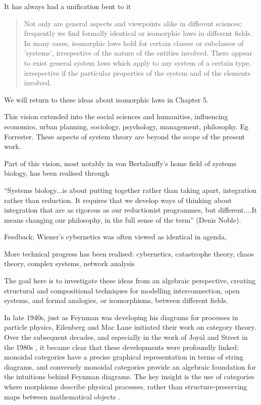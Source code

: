 It has always had a unification bent to it \cite{Ber50}

\begin{quotation}
  Not only are general aspects and viewpoints alike in different sciences;
  frequently we find formally identical or isomorphic laws in different fields.
  In many cases, isomorphic laws hold for certain classes or subclasses of
  'systems', irrespective of the nature of the entities involved. There appear
  to exist general system laws which apply to any system of a certain type,
  irrespective if the particular properties of the system and of the elements
  involved.
\end{quotation}
We will return to these ideas about isomorphic laws in Chapter 5.

This vision extended into the social sciences and humanities, influencing
economics, urban planning, sociology, psychology, management, philosophy. Eg
Forrester. These aspects of system theory are beyond the scope of the present
work.

Part of this vision, most notably in von Bertalanffy's home field of
systems biology, has been realised through 


    ``Systems biology...is about putting together rather than taking apart,
    integration rather than reduction. It requires that we develop ways of
    thinking about integration that are as rigorous as our reductionist
    programmes, but different....It means changing our philosophy, in the full
    sense of the term'' (Denis Noble).

Feedback; Wiener's cybernetics was often viewed as identical in agenda, 

More technical progress has been realised: cybernetics, catastrophe theory,
chaos theory, complex systems, network analysis

The goal here is to investigate these ideas from an algebraic perspective,
creating structural and compositional techniques for modelling
interconnection, open systems, and formal analogies, or isomorphisms, between
different fields.

In late 1940s, just as Feynman was developing his diagrams for processes in
particle physics, Eilenberg and Mac Lane initiated their work on category
theory.  Over the subsequent decades, and especially in the work of Joyal and
Street in the 1980s \cite{JS91,JS93}, it became clear that these developments were profoundly linked: monoidal categories have a precise graphical representation in terms of string diagrams, and conversely monoidal categories provide an algebraic foundation for the intuitions behind Feynman diagrams.  The key insight is the use of categories where morphisms describe physical processes, rather than structure-preserving maps between mathematical objects \cite{BaezStay,CP}.


